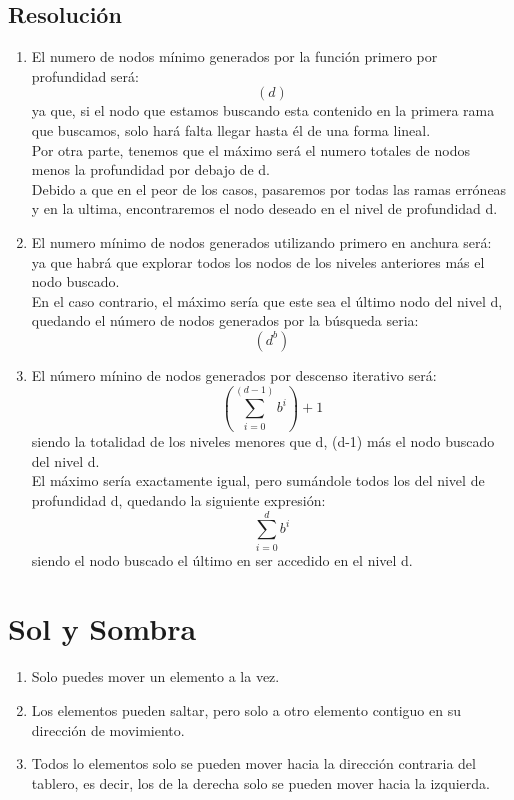 \documentclass[a4paper,10pt]{article}
\begin{document}
\subsection{Resolución}
\begin{enumerate}
	\item El numero de nodos mínimo generados por la función primero por profundidad será:
	\begin{equation}
		(d)
	\end{equation}
	ya que, si el nodo que estamos buscando esta contenido en la primera rama que buscamos, solo hará falta llegar hasta él de una forma lineal.\\
	Por otra parte, tenemos que el máximo será el numero totales de nodos menos la profundidad por debajo de d.
	\begin{equation}
		[n^b-(n-d)]
	\end{equation}
	Debido a que en el peor de los casos, pasaremos por todas las ramas erróneas y en la ultima, encontraremos el nodo deseado en el nivel de profundidad d.
	\item El numero mínimo de nodos generados utilizando primero en anchura será:
	\begin{equation}
		[(d-1^b)+1]
	\end{equation}
	ya que habrá que explorar todos los nodos de los niveles anteriores más el nodo buscado.\\
	En el caso contrario, el máximo sería que este sea el último nodo del nivel d, quedando el número de nodos generados por la búsqueda seria:
	\begin{equation}
		(d^b)
	\end{equation}
	\item El número mínino de nodos generados por descenso iterativo será:
	\begin{equation}
		(\sum_{i=0}^{(d-1)}b^i)+1
	\end{equation}
	siendo la totalidad de los niveles menores que d, (d-1) más el nodo buscado del nivel d.\\
	El máximo sería exactamente igual, pero sumándole todos los del nivel de profundidad d, quedando la siguiente expresión:
	\begin{equation}
		\sum_{i=0}^{d}b^i
	\end{equation}
	siendo el nodo buscado el último en ser accedido en el nivel d.
\end{enumerate}
\section{Sol y Sombra}
\begin{enumerate}
	\item Solo puedes mover un elemento a la vez.
	\item Los elementos pueden saltar, pero solo a otro elemento contiguo en su dirección de movimiento.
	\item Todos lo elementos solo se pueden mover hacia la dirección contraria del tablero, es decir, los de la derecha solo se pueden mover hacia la izquierda.
\end{enumerate}
\end{document}
